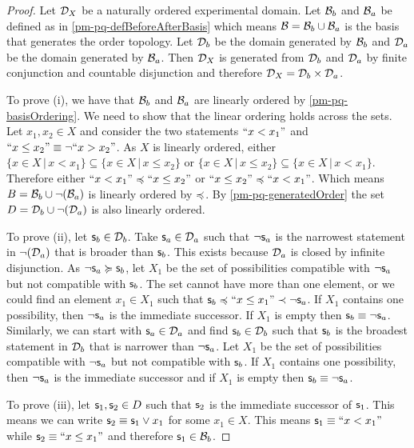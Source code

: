 \begin{mathSection}
	\begin{proof}
		Let $\mathcal{D}_X$ be a naturally ordered experimental domain. Let $\mathcal{B}_b$ and $\mathcal{B}_a$ be defined as in \ref{pm-pq-defBeforeAfterBasis} which means $\mathcal{B} = \mathcal{B}_b \cup \mathcal{B}_a$ is the basis that generates the order topology. Let $\mathcal{D}_b$ be the domain generated by $\mathcal{B}_b$ and $\mathcal{D}_a$ be the domain generated by $\mathcal{B}_a$. Then $\mathcal{D}_X$ is generated from $\mathcal{D}_b$ and $\mathcal{D}_a$ by finite conjunction and countable disjunction and therefore $\mathcal{D}_X = \mathcal{D}_b \times \mathcal{D}_a$.
		
		To prove (i), we have that $\mathcal{B}_b$ and $\mathcal{B}_a$ are linearly ordered by \ref{pm-pq-basisOrdering}. We need to show that the linear ordering holds across the sets. Let $x_1, x_2 \in X$ and consider the two statements $``x < x_1"$ and $``x \leq x_2"\equiv \neg ``x > x_2"$. As $X$ is linearly ordered, either $\{x \in X \, | \, x < x_1\} \subseteq \{x \in X \, | \, x \leq x_2\}$ or $\{x \in X \, | \, x \leq x_2\} \subseteq \{x \in X \, | \, x < x_1\}$. Therefore either $``x < x_1" \preccurlyeq ``x \leq x_2"$ or $``x \leq x_2" \preccurlyeq ``x < x_1"$. Which means $B = \mathcal{B}_b \cup \neg(\mathcal{B}_a)$ is linearly ordered by $\preccurlyeq$. By \ref{pm-pq-generatedOrder} the set $D = \mathcal{D}_b \cup \neg(\mathcal{D}_a)$ is also linearly ordered.
		
		To prove (ii), let $\mathsf{s}_b \in \mathcal{D}_b$. Take $\mathsf{s}_a \in \mathcal{D}_a$ such that $\neg \mathsf{s}_a$ is the narrowest statement in $\neg (\mathcal{D}_a)$ that is broader than $\mathsf{s}_b$. This exists because $\mathcal{D}_a$ is closed by infinite disjunction. As $\neg \mathsf{s}_a \succcurlyeq \mathsf{s}_b$, let $X_1$ be the set of possibilities compatible with $\neg \mathsf{s}_a$ but not compatible with $\mathsf{s}_b$. The set cannot have more than one element, or we could find an element $x_1 \in X_1$ such that $\mathsf{s}_b \preccurlyeq ``x \leq x_1" \prec \neg \mathsf{s}_a$. If $X_1$ contains one possibility, then $\neg \mathsf{s}_a$ is the immediate successor. If $X_1$ is empty then $\mathsf{s}_b \equiv \neg \mathsf{s}_a$. Similarly, we can start with $\mathsf{s}_a \in \mathcal{D}_a$ and find $\mathsf{s}_b \in \mathcal{D}_b$ such that $\mathsf{s}_b$ is the broadest statement in $\mathcal{D}_b$ that is narrower than $\neg \mathsf{s}_a$. Let $X_1$ be the set of possibilities compatible with $\neg \mathsf{s}_a$ but not compatible with $\mathsf{s}_b$. If $X_1$ contains one possibility, then $\neg \mathsf{s}_a$ is the immediate successor and if $X_1$ is empty then $\mathsf{s}_b \equiv \neg \mathsf{s}_a$.
		
		To prove (iii), let $\mathsf{s}_1, \mathsf{s}_2 \in D$ such that $\mathsf{s}_2$ is the immediate successor of $\mathsf{s}_1$. This means we can write $\mathsf{s}_2 \equiv \mathsf{s}_1 \vee x_1$ for some $x_1 \in X$. This means $\mathsf{s}_1 \equiv ``x < x_1"$ while $\mathsf{s}_2 \equiv ``x \leq x_1"$ and therefore $\mathsf{s}_1 \in \mathcal{B}_b$.
		

\end{proof}
\end{mathSection}
